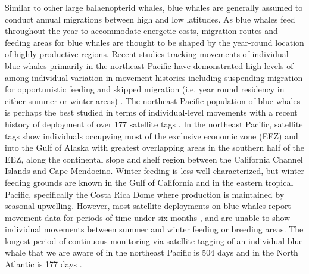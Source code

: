 \documentclass[a4paper,12pt]{article}
\begin{document}
Similar to other large balaenopterid whales, blue whales are generally assumed to conduct annual migrations between high and low latitudes\cite{huckgaete2018}. 
As blue whales feed throughout the year to accommodate energetic costs, migration routes and feeding areas for blue whales are thought to be shaped by the year-round location of highly productive regions\cite{branch2007}. 
Recent studies tracking movements of individual blue whales primarily in the northeast Pacific have demonstrated high levels of among-individual variation in movement histories including suspending migration for opportunistic feeding and skipped migration (i.e. year round residency in either summer or winter
areas) \cite{busquets2017estimating}. 
The northeast Pacific population of blue whales is perhaps the best studied in terms of individual-level movements with a recent history of deployment of over 177 satellite tags \cite{irvine2017quantifying, mate2007evolution}.
In the northeast Pacific, satellite tags show individuals occupying most of the exclusive economic zone (EEZ) and into the Gulf of Alaska \cite{irvine2017quantifying} with greatest overlapping areas in the southern half of the EEZ, along the continental slope and shelf region between the California Channel Islands and Cape Mendocino. 
Winter feeding is less well characterized, but winter feeding grounds are known
in the Gulf of California and in the eastern tropical Pacific, specifically the Costa Rica Dome where production is maintained by seasonal upwelling.
However, most satellite deployments on blue whales report movement data for periods of time under six months \cite{heide2001new, silva2013north, bailey2009behavioural, lesage2017foraging, irvine2017quantifying}, and are unable to show individual movements between summer and winter feeding or breeding areas. 
The longest period of continuous monitoring via satellite tagging of an individual blue whale that we are aware of in the northeast Pacific is 504 days \cite{irvine2017quantifying} and in the North Atlantic is 177 days \cite{lesage2017foraging}.
\end{document}

